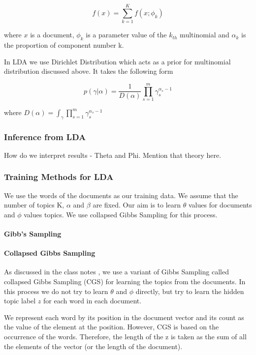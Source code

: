 \documentclass[11pt,a4paper,oneside]{article}
\begin{document}
\begin{equation}
f(x) = \sum^K_{k=1}f(x;\phi_k)
\end{equation}

where $x$ is a document, $\phi_k$ is a parameter value of the $k_{th}$ multinomial and $\alpha_k$ is the proportion of component number k.

In LDA we use Dirichlet Distribution which acts as a prior for multinomial distribution discussed above. It takes the following form \cite{classNotes}

\begin{equation}
p(\gamma|\alpha) = \frac{1}{D(\alpha)}\prod^m_{s=1}\gamma^{\alpha_s - 1}_s
\end{equation}

where ${D(\alpha)} = \int_\gamma \prod^m_{s=1}\gamma^{\alpha_s - 1}_s$

\subsubsection{Inference from LDA}
How do we interpret results - Theta and Phi.
Mention that theory here.

\subsubsection{Training Methods for LDA}

We use the words of the documents as our training data. We assume that the number of topics K, $\alpha$ and $\beta$ are fixed. Our aim is to learn $\theta$ values for documents and $\phi$ values topics. We use collapsed Gibbs Sampling for this process.

\paragraph*{Gibb's Sampling}

\paragraph*{Collapsed Gibbs Sampling}

As discussed in the class notes \cite{classNotes}, we use a variant of Gibbs Sampling called collapsed Gibbs Sampling (CGS) for learning the topics from the documents. In this process we do not try to learn $\theta$ and $\phi$ directly, but try to learn the hidden topic label $z$ for each word in each document.

We represent each word by its position in the document vector and its count as the value of the element at the position. However, CGS is based on the occurrence of the words. Therefore, the length of the z is taken as the sum of all the elements of the vector (or the length of the document).
\end{document}
